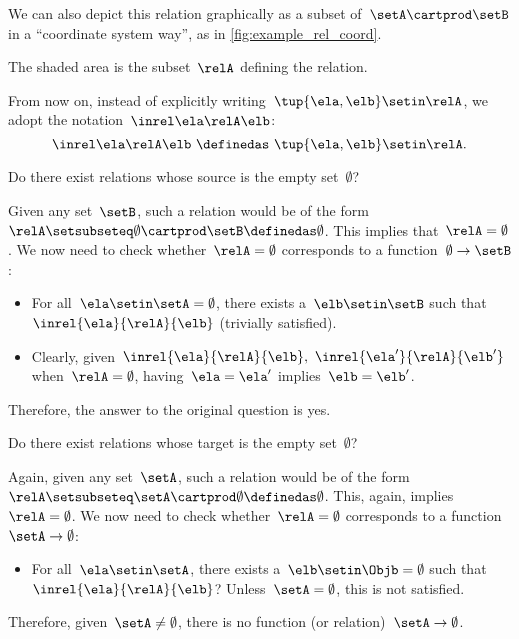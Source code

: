 We can also depict this relation graphically as a subset of~$\setA \cartprod \setB$ in a ``coordinate system way'', as in \cref{fig:example_rel_coord}.

The shaded area is the subset~$\relA$ defining the relation.

\begin{remark}
    From now on, instead of explicitly writing~$\tup{\ela,\elb}\setin \relA$, we adopt the notation~$\inrel \ela \relA \elb$:
    \begin{equation*}
        \inrel \ela \relA \elb \ \definedas\  \tup{\ela,\elb}\setin \relA.
    \end{equation*}
\end{remark}

\begin{exercise}
    Do there exist relations whose source is the empty set~$\emptyset$?
\end{exercise}
\begin{solution}
    Given any set~$\setB$, such a relation would be of the form~$\relA \setsubseteq \emptyset \cartprod \setB \definedas \emptyset$.
    This implies that~$\relA=\emptyset$.
    We now need to check whether~$\relA=\emptyset$ corresponds to a function~$\emptyset\to \setB$:
    \begin{itemize}
        \item For all~$\ela\setin \setA=\emptyset$, there exists a~$\elb \setin \setB$ such that $\inrel{\ela}{\relA}{\elb}$ (trivially satisfied).
        \item Clearly, given~$\inrel{\ela}{\relA}{\elb},~\inrel{\ela'}{\relA}{\elb'}$ when~$\relA=\emptyset$, having~$\ela=\ela'$ implies~$\elb=\elb'$.
    \end{itemize}
    Therefore, the answer to the original question is yes.
\end{solution}

\begin{exercise}
    Do there exist relations whose target is the empty set~$\emptyset$?
\end{exercise}
\begin{solution}
    Again, given any set~$\setA$, such a relation would be of the form~$\relA \setsubseteq \setA \cartprod \emptyset\definedas \emptyset$.
    This, again, implies~$\relA=\emptyset$.
    We now need to check whether~$\relA=\emptyset$ corresponds to a function~$\setA \to \emptyset$:
    \begin{itemize}
        \item For all~$\ela\setin \setA$, there exists a~$\elb\setin \Objb=\emptyset$ such that~$\inrel{\ela}{\relA}{\elb}$?
              Unless~$\setA=\emptyset$, this is not satisfied.
    \end{itemize}
    Therefore, given~$\setA \neq \emptyset$, there is no function (or relation)~$\setA \to \emptyset$.
\end{solution}

